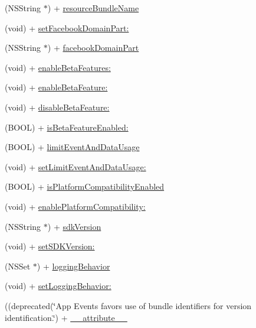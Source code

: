 \begin{DoxyCompactItemize}
\item 
(N\+S\+String $\ast$) + \hyperlink{interfaceFBSettings_ad87ff4e3c9577a22d9a329b12137f976}{resource\+Bundle\+Name}
\item 
(void) + \hyperlink{interfaceFBSettings_a4cfd61825c72f8a5978cb07ba84983d1}{set\+Facebook\+Domain\+Part\+:}
\item 
(N\+S\+String $\ast$) + \hyperlink{interfaceFBSettings_a7ce923f25dd500f81ce518e998bf2f39}{facebook\+Domain\+Part}
\item 
(void) + \hyperlink{interfaceFBSettings_a9ce6bc977fc54c59ba5cacf56922ccac}{enable\+Beta\+Features\+:}
\item 
(void) + \hyperlink{interfaceFBSettings_a390b436e1de87f3d49979a6aa98e14b1}{enable\+Beta\+Feature\+:}
\item 
(void) + \hyperlink{interfaceFBSettings_a6cc67de9d4b0069de4bfc6a3872f7114}{disable\+Beta\+Feature\+:}
\item 
(B\+O\+OL) + \hyperlink{interfaceFBSettings_a16d812cddbf44b8d354393d68757945f}{is\+Beta\+Feature\+Enabled\+:}
\item 
(B\+O\+OL) + \hyperlink{interfaceFBSettings_a3a939ba08bcff55d53c8e42f9a9e0234}{limit\+Event\+And\+Data\+Usage}
\item 
(void) + \hyperlink{interfaceFBSettings_ab0e8e19825a865db7cbf58da4957cf40}{set\+Limit\+Event\+And\+Data\+Usage\+:}
\item 
(B\+O\+OL) + \hyperlink{interfaceFBSettings_a257796e070b7f063dedaa95706946134}{is\+Platform\+Compatibility\+Enabled}
\item 
(void) + \hyperlink{interfaceFBSettings_a896c1bdd4227035fba49c90d06c101a2}{enable\+Platform\+Compatibility\+:}
\item 
(N\+S\+String $\ast$) + \hyperlink{interfaceFBSettings_a54528a8eee1469b7202d0e4825f08604}{sdk\+Version}
\item 
(void) + \hyperlink{interfaceFBSettings_afd9810381ac6027e6400879cb68ba46e}{set\+S\+D\+K\+Version\+:}
\item 
(N\+S\+Set $\ast$) + \hyperlink{interfaceFBSettings_a6fe525188c97270c4d4a6781c4d6ee11}{logging\+Behavior}
\item 
(void) + \hyperlink{interfaceFBSettings_aaaf513653d6a8e2d05e0ecea865155c0}{set\+Logging\+Behavior\+:}
\item 
((deprecated(\char`\"{}App Events favors use of bundle identifiers for version identification.\char`\"{}) + \hyperlink{interfaceFBSettings_a2e999eddc513423b7071f27bc09589aa}{\+\_\+\+\_\+attribute\+\_\+\+\_\+}
\item 

\end{DoxyCompactItemize}
